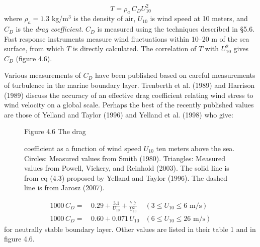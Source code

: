 \begin{equation}
T = \rho_a \,C_D U_{10}^2
\end{equation}
where $\rho_a = 1.3$ kg/m$^3$ is the density of air, $U_{10}$ is wind
speed at 10 meters, and $C_D$ is the \textit{drag
  coefficient}.  $C_D$ is measured
using the techniques described in \S5.6. Fast response instruments
measure wind fluctuations within 10--20 m of the sea surface, from
which $T$ is directly calculated. The correlation of $T$ with
$U_{10}^2$ gives $C_D$ (figure 4.6).

Various measurements of $C_D$ have been published based on careful
measurements of turbulence in the
marine boundary layer. Trenberth et al.  (1989) and Harrison (1989)
discuss the accuracy of an effective
drag coefficient relating wind
stress to wind velocity on a
global scale. Perhaps the best of the recently published values are
those of Yelland and Taylor (1996) and Yelland et al.  (1998) who
give:

\begin{figure}[t!]
\footnotesize
Figure 4.6 The drag\rule{0mm}{3ex} coefficient as a function of wind
speed $U_{10}$ ten meters above the sea. Circles: Measured values from
Smith (1980). Triangles: Measured values from Powell, Vickery, and
Reinhold (2003). The solid line is from eq (4.3) proposed by Yelland
and Taylor (1996). The dashed line is from Jarosz (2007).
\label{fig:dragcoefficient}
\vspace{-3ex}
\end{figure}

\begin{subequations}
\begin {align}
1000 \, C_D = & \,0.29 + \frac{3.1}{U_{10}} + \frac{7.7}{U_{10}^2} & \left( 3 \le
U_{10}
\le 6 \text{ m/s}\right) \\
 1000 \, C_D = & \,0.60 + 0.071 \, U_{10} & \left( 6 \le U_{10} \le 26 \text{ m/s}
\right)
\end{align}
\end{subequations}
for neutrally stable boundary layer. Other values are listed in their
table 1 and in figure 4.6.

